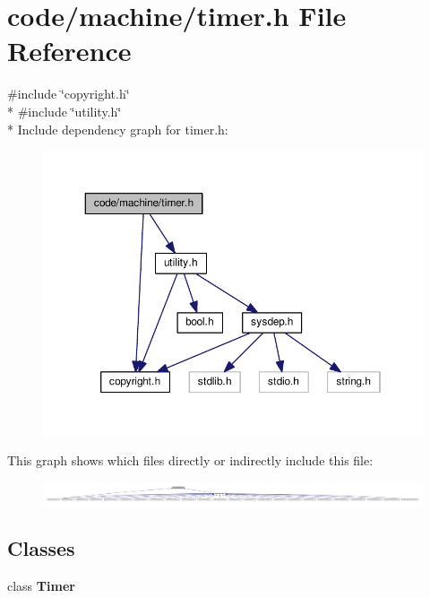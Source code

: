 \section{code/machine/timer.h File Reference}
\label{timer_8h}
{\ttfamily \#include \char`\"{}copyright.\+h\char`\"{}}\\*
{\ttfamily \#include \char`\"{}utility.\+h\char`\"{}}\\*
Include dependency graph for timer.\+h\+:
\nopagebreak
\begin{figure}[H]
\begin{center}
\leavevmode
\includegraphics[width=350pt]{timer_8h__incl}
\end{center}
\end{figure}
This graph shows which files directly or indirectly include this file\+:
\nopagebreak
\begin{figure}[H]
\begin{center}
\leavevmode
\includegraphics[width=350pt]{timer_8h__dep__incl}
\end{center}
\end{figure}
\subsection*{Classes}
\begin{DoxyCompactItemize}
\item 
class {\bf Timer}
\end{DoxyCompactItemize}
